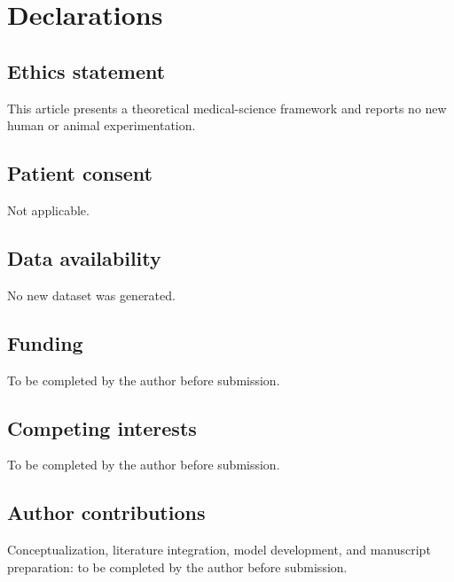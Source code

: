 \documentclass[11pt]{article}
\begin{document}
\section*{Declarations}
\subsection*{Ethics statement}
This article presents a theoretical medical-science framework and reports no new human or animal experimentation.

\subsection*{Patient consent}
Not applicable.

\subsection*{Data availability}
No new dataset was generated.

\subsection*{Funding}
To be completed by the author before submission.

\subsection*{Competing interests}
To be completed by the author before submission.

\subsection*{Author contributions}
Conceptualization, literature integration, model development, and manuscript preparation: to be completed by the author before submission.
\end{document}
